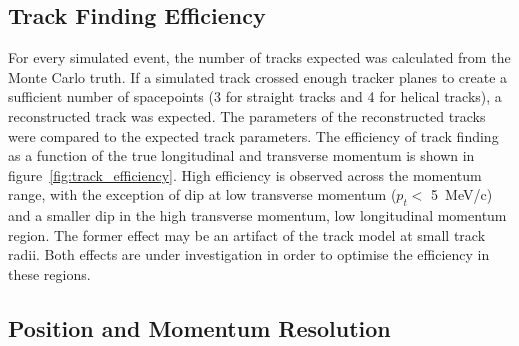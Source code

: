   \subsection{Track Finding Efficiency}
  \label{sec:performance:track_finding}

  For every simulated event, the number of tracks expected was calculated from the Monte Carlo truth. If a simulated track crossed enough tracker planes to create a sufficient number of spacepoints (3 for straight tracks and 4 for helical tracks), a reconstructed track was expected. The parameters of the reconstructed tracks were compared to the expected track parameters. The efficiency of track finding as a function of the true longitudinal and transverse momentum is shown in figure~\ref{fig:track_efficiency}. High efficiency is observed across the momentum range, with the exception of dip at low transverse momentum ($p_t <$ 5~MeV/c) and a smaller dip in the high transverse momentum, low longitudinal momentum region. The former effect may be an artifact of the track model at small track radii. Both effects are under investigation in order to optimise the efficiency in these regions.


  \subsection{Position and Momentum Resolution}
  \label{sec:performance:resolutions}
  
  

